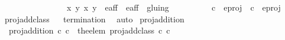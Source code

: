 \begin{isabellebody}
\ \ \ \ \ \ \ \ \ \ \ \ \ \ \ \ {\isacharparenleft}{\isacharparenleft}x\ y\ {\isacharparenleft}x\ y\ {\isasymin}\ e{\isacharprime}{\isacharunderscore}aff{\isacharunderscore}{}\ {\isasymunion}\ e{\isacharprime}{\isacharunderscore}aff{\isacharunderscore}{}{\isacharbraceright}{\isacharparenright}\ {\isacharslash}{\isacharslash}\ gluing\isanewline
\ \ \ \ \ \ {\isachardoublequoteclose}\ \isanewline
\ \ {\isachardoublequoteopen}c\ {\isasymin}\ e{\isacharunderscore}proj{\isachardoublequoteclose}\ \ {\isachardoublequoteopen}c\ {\isasymin}\ e{\isacharunderscore}proj{\isachardoublequoteclose}\ \isanewline
%
\isadelimproof
\ \ %
\endisadelimproof
%
\isatagproof
{}\isamarkupfalse%
%
\endisatagproof
{\isafoldproof}%
%
\isadelimproof
\isanewline
%
\endisadelimproof
\isanewline
{}\isamarkupfalse%
\ proj{\isacharunderscore}add{\isacharunderscore}class%
\isadelimproof
\ %
\endisadelimproof
%
\isatagproof
{}\isamarkupfalse%
\ {\isachardoublequoteopen}termination{\isachardoublequoteclose}\ \isamarkupfalse%
\ auto%
\endisatagproof
{\isafoldproof}%
%
\isadelimproof
%
\endisadelimproof
\isanewline
\isanewline
{}\isamarkupfalse%
\ proj{\isacharunderscore}addition\ \ \isanewline
\ \ {\isachardoublequoteopen}proj{\isacharunderscore}addition\ c\ c\ {\isacharequal}\ the{\isacharunderscore}elem\ {\isacharparenleft}proj{\isacharunderscore}add{\isacharunderscore}class\ c\ c\isanewline
\isanewline
\isanewline
\isanewline
\isanewline
\isanewline
{}\isamarkupfalse%
\isanewline
%
\isadelimtheory
\isanewline
%
\endisadelimtheory
%
\isatagtheory
{}\isamarkupfalse%
%
\endisatagtheory
{\isafoldtheory}%
%
\isadelimtheory
%
\endisadelimtheory
%
\end{isabellebody}%
\endinput
